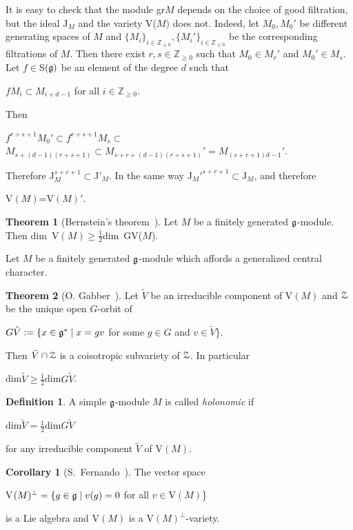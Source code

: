 \documentclass[12pt]{amsart}
\theoremstyle{definition}\newtheorem{theorem}{Theorem}[section]
\newtheorem{corollary}[proposition]{Corollary}
\theoremstyle{definition}\newtheorem{definition}[proposition]{Definition}
\theoremstyle{remark}\newtheorem{example}[proposition]{Example}
\begin{document}
It is easy to check that the module gr$M$ depends on the choice of good filtration, but the ideal J$_M$  and the variety V($M)$ does not. Indeed, let $M_0, M_0'$ be different generating spaces of $M$ and $\{M_i\}_{i\in\mathbb Z_{\ge0}}, \{M_i'\}_{i\in\mathbb Z_{\ge0}}$ be the corresponding filtrations of $M$. Then there exist $r, s\in\mathbb Z_{\ge0}$ such that $M_0\in M_r'$ and $M_0'\in M_s$. Let $f\in$S$(\frak g)$ be an element of the degree $d$ such that \begin{center}$fM_i\subset M_{i+d-1}$ for all $i\in\mathbb Z_{\ge0}$.\end{center} Then \begin{center}$f^{r+s+1}M_0'\subset f^{r+s+1}M_s\subset$\\$M_{s+(d-1)(r+s+1)}\subset M_{s+r+(d-1)(r+s+1)}'=M_{(s+r+1)d-1}'$.\end{center} Therefore J$^{s+r+1}_M\subset$J$'_M$. In the same way J$_M'^{s+r+1}\subset$J$_M$, and therefore \begin{center}V$(M)$=V$(M)'$.\end{center}
\begin{theorem}[Bernstein's theorem~{\cite[p. 118]{KL}}]\label{Tber} Let $M$ be a finitely generated $\frak g$-module. Then dim~V$(M)\ge\frac{1}{2}$dim~GV($M$).\end{theorem}
Let $M$ be a finitely generated $\frak g$-module which affords a generalized central character.
\begin{theorem}[O. Gabber~\cite{Gab}]\label{Gab} Let $\tilde V$ be an irreducible component of V$(M)$ and $\EuScript Z$ be the unique open $G$-orbit of \begin{center}$G\tilde V:=\{x\in\frak g^*\mid x=gv$ for some $g\in G$ and $v\in\tilde V$\}.\end{center} Then $\tilde V\cap \EuScript Z$ is a coisotropic subvariety of $\EuScript Z$. In particular \begin{center}dim$\tilde V\ge\frac{1}{2}$dim$G\tilde V$.\end{center}\end{theorem}
\begin{definition}\label{Dhol} A simple $\frak g$-module $M$ is called {\it holonomic} if \begin{center}dim$\tilde V=\frac{1}{2}$dim$G\tilde V$\end{center} for any irreducible component $\tilde V$ of V$(M)$.\end{definition}
\begin{corollary}[S.~Fernando~\cite{F}] The vector space \begin{center}V$(M)^\bot=\{g\in\frak g\mid v(g)=0$ for all $v\in$V$(M)$\}\end{center} is a Lie algebra and V$(M)$ is a
V$(M)^\bot$-variety.\end{corollary}
\end{document}
